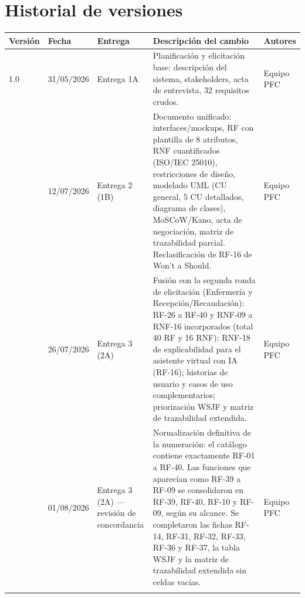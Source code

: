\documentclass[11pt,a4paper]{article}
\begin{document}
	\section*{Historial de versiones}
	\begin{longtable}{@{}p{1.1cm}p{1.6cm}p{2.1cm}p{6.4cm}p{2.7cm}@{}}
		\toprule
		\textbf{Versión} & \textbf{Fecha} & \textbf{Entrega} & \textbf{Descripción del cambio} & \textbf{Autores} \\
		\midrule
		\endhead
		1.0 & 31/05/2026 & Entrega 1A & Planificación y elicitación base: descripción del sistema, stakeholders, acta de entrevista, 32 requisitos crudos. & Equipo PFC \\
		\addlinespace
		2.0 & 12/07/2026 & Entrega 2 (1B) & Documento unificado: interfaces/mockups, RF con plantilla de 8 atributos, RNF cuantificados (ISO/IEC 25010), restricciones de diseño, modelado UML (CU general, 5 CU detallados, diagrama de clases), MoSCoW/Kano, acta de negociación, matriz de trazabilidad parcial. Reclasificación de RF-16 de Won't a Should. & Equipo PFC \\
		\addlinespace
		3.0 & 26/07/2026 & Entrega 3 (2A) & Fusión con la segunda ronda de elicitación (Enfermería y Recepción/Recaudación): RF-26 a RF-40 y RNF-09 a RNF-16 incorporados (total 40 RF y 16 RNF); RNF-18 de explicabilidad para el asistente virtual con IA (RF-16); historias de usuario y casos de uso complementarios; priorización WSJF y matriz de trazabilidad extendida. & Equipo PFC \\
		\addlinespace
		3.1 & 01/08/2026 & Entrega 3 (2A) --- revisión de concordancia & Normalización definitiva de la numeración: el catálogo contiene exactamente RF-01 a RF-40. Las funciones que aparecían como RF-39 a RF-09 se consolidaron en RF-39, RF-40, RF-10 y RF-09, según su alcance. Se completaron las fichas RF-14, RF-31, RF-32, RF-33, RF-36 y RF-37, la tabla WSJF y la matriz de trazabilidad extendida sin celdas vacías. & Equipo PFC \\
		\addlinespace
		

\end{longtable}
\end{document}

